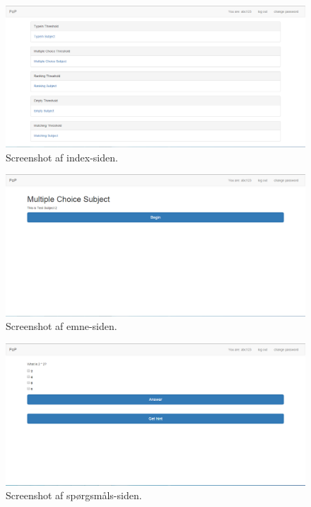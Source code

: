 \documentclass[11pt, a4paper]{article}
\begin{document}
\begin{figure}[h!]
    \centering
    \includegraphics[width=1\linewidth]{figures/interface/overview.png}
    \caption{Screenshot af index-siden.}
    \label{fig:screenshot_overview}
\end{figure}


\begin{figure}[h!]
    \centering
    \includegraphics[width=1\linewidth]{figures/interface/subject.png}
    \caption{Screenshot af emne-siden.}
    \label{fig:screenshot_subject}
\end{figure}


\begin{figure}[h!]
    \centering
    \includegraphics[width=1\linewidth]{figures/interface/question.png}
    \caption{Screenshot af spørgsmåls-siden.}
    \label{fig:screenshot_question}
\end{figure}
\end{document}
